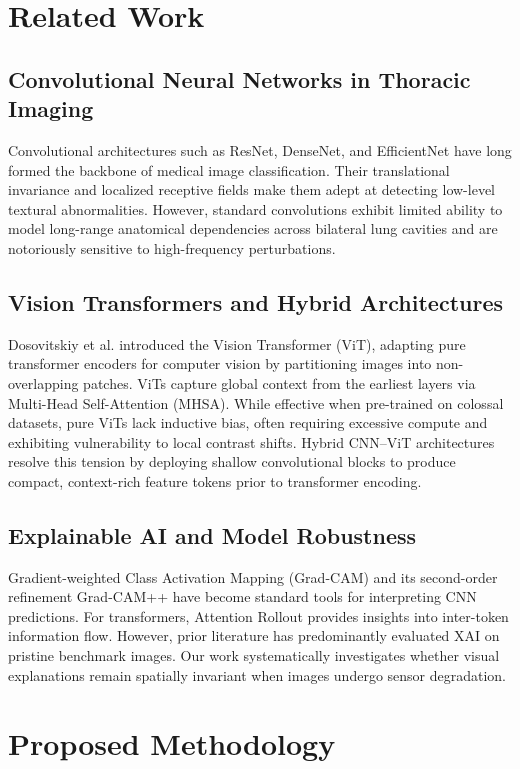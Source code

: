 \documentclass[journal]{IEEEtran}
\begin{document}
\section{Related Work}

\subsection{Convolutional Neural Networks in Thoracic Imaging}
Convolutional architectures such as ResNet, DenseNet, and EfficientNet have long formed the backbone of medical image classification. Their translational invariance and localized receptive fields make them adept at detecting low-level textural abnormalities. However, standard convolutions exhibit limited ability to model long-range anatomical dependencies across bilateral lung cavities and are notoriously sensitive to high-frequency perturbations.

\subsection{Vision Transformers and Hybrid Architectures}
Dosovitskiy et al. introduced the Vision Transformer (ViT), adapting pure transformer encoders for computer vision by partitioning images into non-overlapping patches. ViTs capture global context from the earliest layers via Multi-Head Self-Attention (MHSA). While effective when pre-trained on colossal datasets, pure ViTs lack inductive bias, often requiring excessive compute and exhibiting vulnerability to local contrast shifts. Hybrid CNN--ViT architectures resolve this tension by deploying shallow convolutional blocks to produce compact, context-rich feature tokens prior to transformer encoding.

\subsection{Explainable AI and Model Robustness}
Gradient-weighted Class Activation Mapping (Grad-CAM) and its second-order refinement Grad-CAM++ have become standard tools for interpreting CNN predictions. For transformers, Attention Rollout provides insights into inter-token information flow. However, prior literature has predominantly evaluated XAI on pristine benchmark images. Our work systematically investigates whether visual explanations remain spatially invariant when images undergo sensor degradation.

\section{Proposed Methodology}
\end{document}

